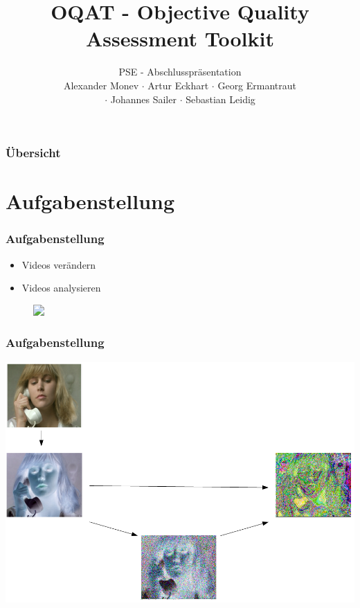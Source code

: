 \documentclass[t]{beamer}
\title{OQAT - Objective Quality Assessment Toolkit}
\subtitle{PSE - Abschlusspräsentation \\[0.3cm]
Alexander Monev $\cdot$ Artur Eckhart $\cdot$ Georg Ermantraut\\ $\cdot$ Johannes Sailer  $\cdot$ Sebastian
Leidig}
\institute[ITEC]{Institut für Technische Informatik}
\begin{document}
\begin{frame}
	\maketitle
\end{frame}

\begin{frame}
	\frametitle{Übersicht}
	\tableofcontents
\end{frame}

\section{Aufgabenstellung}

\begin{frame}
	\frametitle{Aufgabenstellung}
	
		
			\begin{itemize}
				\item <+-> Videos verändern
				\item <+-> Videos analysieren
			\end{itemize}
			\begin{figure}
				\includegraphics<4->[scale=.45]{img/aufgabe.png}
			\end{figure}
		
				

\end{frame}
\begin{frame}
	\frametitle{Aufgabenstellung}
	\begin{center}
		\vspace*{\fill}
		\includegraphics[scale=.35]{img/aufgabe2.png}
		\vspace*{\fill} ~\\
	\end{center}
\end{frame}
\end{document}
